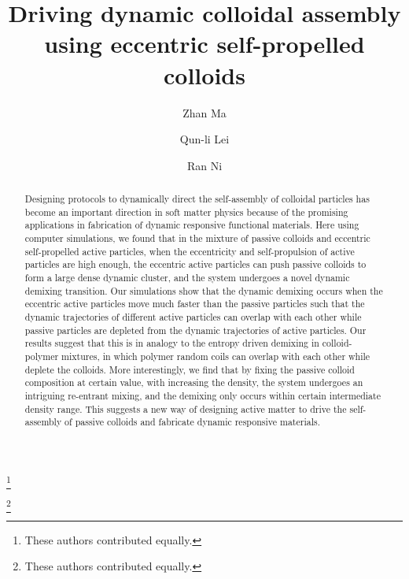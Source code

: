 \documentclass[prl, twocolumn, showpacs, preprintnumbers,amsmath,amssymb]{revtex4-1}
\begin{document}
\title{Driving dynamic colloidal assembly using eccentric self-propelled colloids}




\author{Zhan Ma}
  \thanks{These authors contributed equally.}
\author{Qun-li Lei}
  \thanks{These authors contributed equally.}
\author{Ran Ni}

\begin{abstract}
Designing protocols to dynamically direct the self-assembly of colloidal particles has become an important direction in soft matter physics because of the promising applications in fabrication of dynamic responsive functional materials.
Here using computer simulations, we found that in the mixture of passive colloids and eccentric self-propelled active particles, when the eccentricity and self-propulsion of active particles are high enough, the eccentric active particles can push passive colloids to form a large dense dynamic cluster, and the system undergoes a novel dynamic demixing transition.
Our simulations show that the dynamic demixing occurs when the eccentric active particles move much faster than the passive particles such that the dynamic trajectories of different active particles can overlap with each other while passive particles are depleted from the dynamic trajectories of active particles.
Our results suggest that this is in analogy to the entropy driven demixing in colloid-polymer mixtures, in which polymer random coils can overlap with each other while deplete the colloids. 
More interestingly, we find that by fixing the passive colloid composition at certain value, with increasing the density, the system undergoes an intriguing re-entrant mixing, and the demixing only occurs within certain intermediate density range.
This suggests a new way of designing active matter to drive the self-assembly of passive colloids and fabricate dynamic responsive materials.
\end{abstract}


\maketitle
\end{document}
